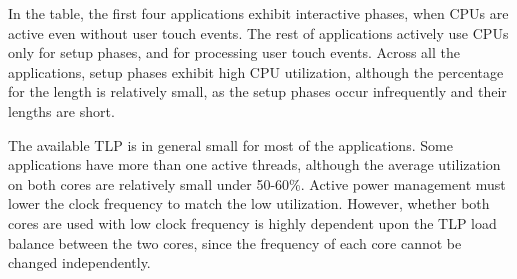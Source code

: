 In the table, the first four applications exhibit interactive phases, when CPUs are active
even without user touch events. 
The rest of applications actively use CPUs only for
setup phases, and for processing user touch events.
Across all the applications, setup phases exhibit high CPU utilization, although the percentage
for the length is relatively small, as the setup phases occur infrequently and their lengths are short.

The available TLP is in general small for most of the applications. 
Some applications have more than one active threads, although the average utilization on both cores are
relatively small under 50-60\%. Active power management must lower the clock frequency to match the
low utilization. However, whether both cores are used with low clock frequency is highly dependent upon
the TLP load balance between the two cores, since the frequency of each core cannot be changed independently.
